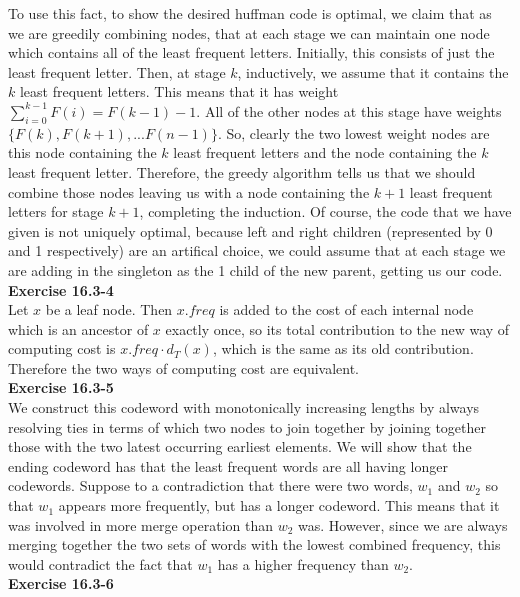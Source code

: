 \documentclass{article}
\begin{document}
To use this fact, to show the desired huffman code is optimal, we claim that as we are greedily combining nodes, that at each stage we can maintain one node which contains all of the least frequent letters. Initially, this consists of just the least frequent letter. Then, at stage $k$, inductively, we assume that it contains the $k$ least frequent letters. This means that it has weight $\sum_{i=0}^{k-1} F(i) = F(k-1)-1$. All of the other nodes at this stage have weights $\{F(k), F(k+1), ... F(n-1)\}$. So, clearly the two lowest weight nodes are this node containing the $k$ least frequent letters and the node containing the $k$ least frequent letter. Therefore, the greedy algorithm tells us that we should combine those nodes leaving us with a node containing the $k+1$ least frequent letters for stage $k+1$, completing the induction. Of course, the code that we have given is not uniquely optimal, because left and right children (represented by 0 and 1 respectively) are an artifical choice, we could assume that at each stage we are adding in the singleton as the 1 child of the new parent, getting us our code.\\

\noindent\textbf{Exercise 16.3-4}\\

Let $x$ be a leaf node.  Then $x.freq$ is added to the cost of each internal node which is an ancestor of $x$ exactly once, so its total contribution to the new way of computing cost is $x.freq\cdot d_T(x)$, which is the same as its old contribution.  Therefore the two ways of computing cost are equivalent. \\

\noindent\textbf{Exercise 16.3-5}\\
We construct this codeword with monotonically increasing lengths by always resolving ties in terms of which two nodes to join together by joining together those with the two latest occurring earliest elements. We will show that the ending codeword has that the least frequent words are all having longer codewords. Suppose to a contradiction that there were two words, $w_1$ and $w_2$ so that $w_1$ appears more frequently, but has a longer codeword. This means that it was involved in more merge operation than $w_2$ was. However, since we are always merging together the two sets of words with the lowest combined frequency, this would contradict the fact that $w_1$ has a higher frequency than $w_2$.\\

\noindent\textbf{Exercise 16.3-6}\\
\end{document}
